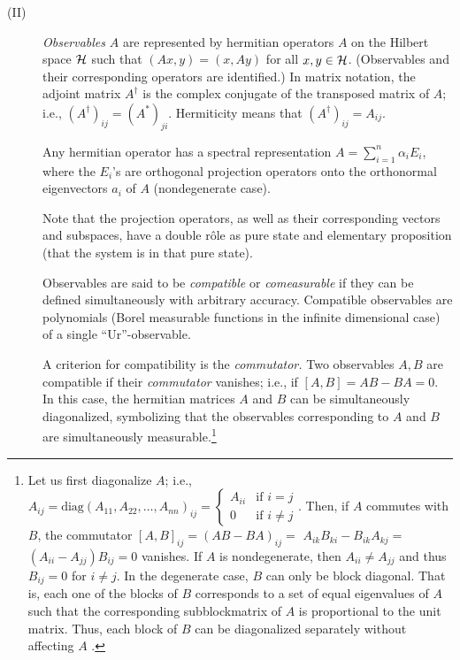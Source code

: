 \documentclass [11pt]{llncs}
\begin{document}
\begin{description}
\item[(II)]
{\em Observables} $A$ are represented by hermitian
operators $A$
on the Hilbert space ${\cal H}$ such that $(Ax,y)=(x,Ay)$ for all
$x,y\in {\cal H}$. (Observables and their corresponding operators are
identified.) In matrix notation, the adjoint matrix $A^\dagger $ is the
complex conjugate of the transposed matrix of $A$; i.e., $(A^\dagger
)_{ij}=(A^\ast )_{ji}$.
Hermiticity means that $(A^\dagger)_{ij} =A_{ij}$.


Any hermitian operator has a spectral representation
$A=\sum_{i=1}^n \alpha_i E_i$,
where the $E_i$'s  are orthogonal projection operators onto the
orthonormal eigenvectors $a_i$ of $A$
(nondegenerate
case).

Note that the projection operators, as well as their corresponding
vectors and subspaces, have a double r\^{o}le as pure state and
elementary proposition (that the system is in that pure state).


Observables are said to be {\em compatible} or {\em comeasurable} if
they can be defined simultaneously with arbitrary accuracy.
Compatible observables are polynomials (Borel measurable functions in
the infinite dimensional case) of a single ``Ur''-observable.

A criterion for compatibility is the {\em commutator.}
Two observables ${A},{B}$ are compatible if their {\em
commutator} vanishes; i.e.,
if $\left[
{A},
{B}
\right] =
{A}
{B}  -
{B}
{A}   =0$.
In this case, the hermitian matrices  $A$ and $B$ can be
simultaneously diagonalized, symbolizing that the observables
corresponding to $A$ and
$B$ are
simultaneously measurable.\footnote{ Let us first diagonalize $A$; i.e., $A_{ij}=\textrm{diag
}(A_{11},A_{22},\ldots ,A_{nn})_{ij}=
\left\{
\begin{array}{cc}
A_{ii}&\textrm{if }i=j\\
0&\textrm{if }i\neq j
\end{array}
\right.$.
Then, if $A$ commutes with $B$, the commutator
$[A,B]_{ij}= (AB-BA)_{ij}=$ $A_{ik}B_{ki}-B_{ik}A_{kj}=$
$(A_{ii}-A_{jj})B_{ij}=0$ vanishes. If $A$ is nondegenerate, then
$A_{ii}\neq A_{jj}$ and thus $B_{ij}=0$ for $i\neq j$.
In the degenerate case, $B$ can only be block diagonal. That is, each
one of
the blocks of $B$ corresponds to a set of equal eigenvalues of $A$ such
that the corresponding subblockmatrix of $A$ is proportional to the unit
matrix. Thus, each block of $B$ can be diagonalized separately without
affecting $A$ \cite[p. 71]{peres}.\label{fnl1}}




\end{description}
\end{document}
